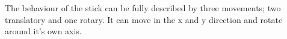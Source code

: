 The behaviour of the stick can be fully described by three movements; two translatory and one rotary. It can move in the x and y direction and rotate around it's own axis.

%
%

